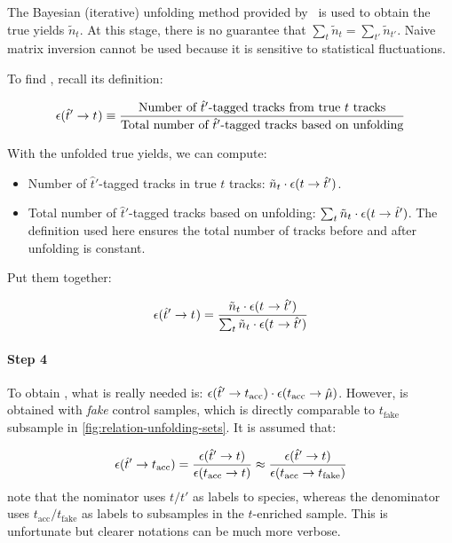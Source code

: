 The Bayesian (iterative) unfolding method provided by \RooUnfold\ is used to
obtain the true yields $\tilde{n}_t$.
At this stage, there is no guarantee that
$\sum_t \tilde{n}_t = \sum_{t'} \tilde{n}_{t'}$.
Naive matrix inversion cannot be used because it is sensitive to statistical
fluctuations.  %

To find , recall its definition:

\begin{equation}
    \misEff[\hat{t}']{t^{\phantom{}}} \equiv
        \frac{
            \text{Number of $\hat{t}'$-tagged tracks from true $t$ tracks}
        }{
            \text{Total number of $\hat{t}'$-tagged tracks based on unfolding}
        }
\end{equation}

With the unfolded true yields, we can compute:

\begin{itemize}
    \item Number of $\hat{t}'$-tagged tracks in true $t$ tracks:
        $\tilde{n}_t \cdot \misEff[t]{\hat{t}'}$.
    \item Total number of $\hat{t}'$-tagged tracks based on unfolding:
        $\sum_t \tilde{n}_t \cdot \misEff[t]{\hat{t}'}$.
        The definition used here ensures the total number of tracks before and
        after unfolding is constant.
\end{itemize}

Put them together:

\begin{equation}
    \misEff[\hat{t}']{t^{\phantom{}}} =
        \frac{
            \tilde{n}_t \cdot \misEff[t^{\phantom{}}]{\hat{t}'}
        }{
            \sum_t \tilde{n}_t \cdot \misEff[t^{\phantom{}}]{\hat{t}'}
        }
\end{equation}

\paragraph{Step 4}
To obtain \misEff[\hat{t}']{\hat{\mu}},
what is really needed is:
$\misEff[\hat{t}']{t_\text{acc}} \cdot \misEff[t_\text{acc}]{\hat{\mu}}$.
However,  is obtained with \emph{fake} \muon control
samples, which is directly comparable to $t_\text{fake}$ subsample in
\cref{fig:relation-unfolding-sets}.
It is assumed that:

\begin{equation}
    \misEff[\hat{t}']{t_\text{acc}} =
    \frac{
        \misEff[\hat{t}']{t}
    }{
        \misEff[t_\text{acc}]{t}
    } \approx
    \frac{
        \misEff[\hat{t}']{t}
    }{
        \misEff[t_\text{acc}]{t_\text{fake}}
    }
\end{equation}
note that the nominator uses $t/t'$ as labels to species, whereas the
denominator uses $t_\text{acc}/t_\text{fake}$ as labels to subsamples
in the $t$-enriched \pidcalib sample.
This is unfortunate but clearer notations can be much more verbose.
